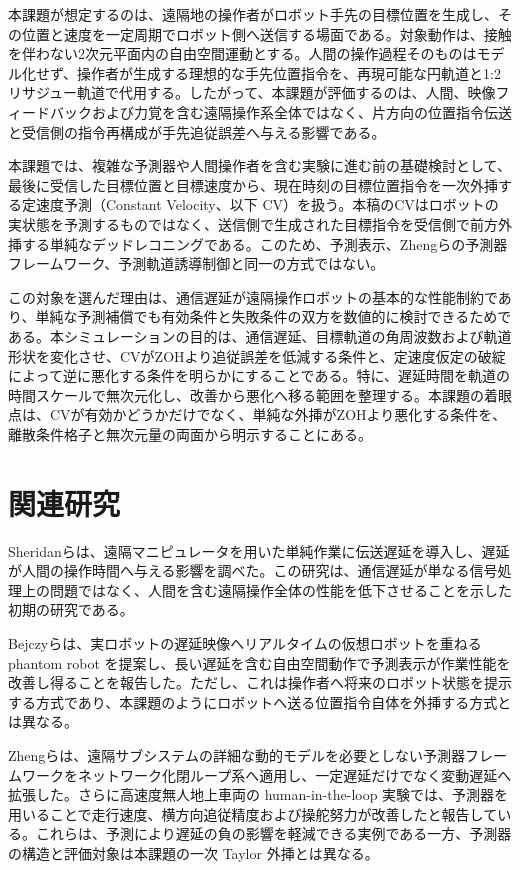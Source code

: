 \documentclass[11pt,a4paper]{article}
\begin{document}
本課題が想定するのは、遠隔地の操作者がロボット手先の目標位置を生成し、その位置と速度を一定周期でロボット側へ送信する場面である。対象動作は、接触を伴わない2次元平面内の自由空間運動とする。人間の操作過程そのものはモデル化せず、操作者が生成する理想的な手先位置指令を、再現可能な円軌道と1:2リサジュー軌道で代用する。したがって、本課題が評価するのは、人間、映像フィードバックおよび力覚を含む遠隔操作系全体ではなく、片方向の位置指令伝送と受信側の指令再構成が手先追従誤差へ与える影響である。

本課題では、複雑な予測器や人間操作者を含む実験に進む前の基礎検討として、最後に受信した目標位置と目標速度から、現在時刻の目標位置指令を一次外挿する定速度予測（Constant Velocity、以下 CV）を扱う。本稿のCVはロボットの実状態を予測するものではなく、送信側で生成された目標指令を受信側で前方外挿する単純なデッドレコニングである。このため、予測表示\cite{bejczy1990}、Zhengらの予測器フレームワーク\cite{zheng2018,zheng2020}、予測軌道誘導制御\cite{zhang2023}と同一の方式ではない。

この対象を選んだ理由は、通信遅延が遠隔操作ロボットの基本的な性能制約であり、単純な予測補償でも有効条件と失敗条件の双方を数値的に検討できるためである。本シミュレーションの目的は、通信遅延、目標軌道の角周波数および軌道形状を変化させ、CVがZOHより追従誤差を低減する条件と、定速度仮定の破綻によって逆に悪化する条件を明らかにすることである。特に、遅延時間を軌道の時間スケールで無次元化し、改善から悪化へ移る範囲を整理する。本課題の着眼点は、CVが有効かどうかだけでなく、単純な外挿がZOHより悪化する条件を、離散条件格子と無次元量の両面から明示することにある。

\section{関連研究}

Sheridanら\cite{sheridan1963}は、遠隔マニピュレータを用いた単純作業に伝送遅延を導入し、遅延が人間の操作時間へ与える影響を調べた。この研究は、通信遅延が単なる信号処理上の問題ではなく、人間を含む遠隔操作全体の性能を低下させることを示した初期の研究である。

Bejczyら\cite{bejczy1990}は、実ロボットの遅延映像へリアルタイムの仮想ロボットを重ねる phantom robot を提案し、長い遅延を含む自由空間動作で予測表示が作業性能を改善し得ることを報告した。ただし、これは操作者へ将来のロボット状態を提示する方式であり、本課題のようにロボットへ送る位置指令自体を外挿する方式とは異なる。

Zhengら\cite{zheng2018}は、遠隔サブシステムの詳細な動的モデルを必要としない予測器フレームワークをネットワーク化閉ループ系へ適用し、一定遅延だけでなく変動遅延へ拡張した。さらに高速度無人地上車両の human-in-the-loop 実験では、予測器を用いることで走行速度、横方向追従精度および操舵努力が改善したと報告している\cite{zheng2020}。これらは、予測により遅延の負の影響を軽減できる実例である一方、予測器の構造と評価対象は本課題の一次 Taylor 外挿とは異なる。
\end{document}
